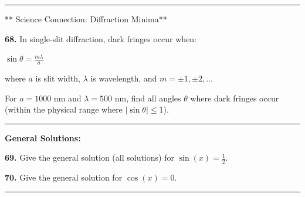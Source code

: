 \documentclass[
  11pt,
]{article}
\begin{document}
\begin{center}\rule{0.5\linewidth}{0.5pt}\end{center}

** Science Connection: Diffraction Minima**

\textbf{68.} In single-slit diffraction, dark fringes occur when:

\(\sin\theta = \frac{m\lambda}{a}\)

where \(a\) is slit width, \(\lambda\) is wavelength, and
\(m = \pm 1, \pm 2, ...\)

For \(a = 1000\) nm and \(\lambda = 500\) nm, find all angles \(\theta\)
where dark fringes occur (within the physical range where
\(|\sin\theta| \leq 1\)).

\begin{center}\rule{0.5\linewidth}{0.5pt}\end{center}

\textbf{General Solutions:}

\textbf{69.} Give the general solution (all solutions) for
\(\sin(x) = \frac{1}{2}\).

\textbf{70.} Give the general solution for \(\cos(x) = 0\).

\begin{center}\rule{0.5\linewidth}{0.5pt}\end{center}
\end{document}
